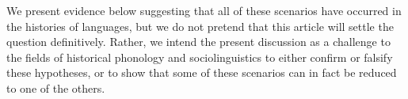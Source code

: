 \documentclass[10pt,letterpaper]{article}
\begin{document}
\noindent We present evidence below suggesting that all of these scenarios have occurred in the histories of languages, but we do not pretend that this article will settle the question definitively. Rather, we intend the present discussion as a challenge to the fields of historical phonology and sociolinguistics to either confirm or falsify these hypotheses, or to show that some of these scenarios can in fact be reduced to one of the others.
\end{document}

